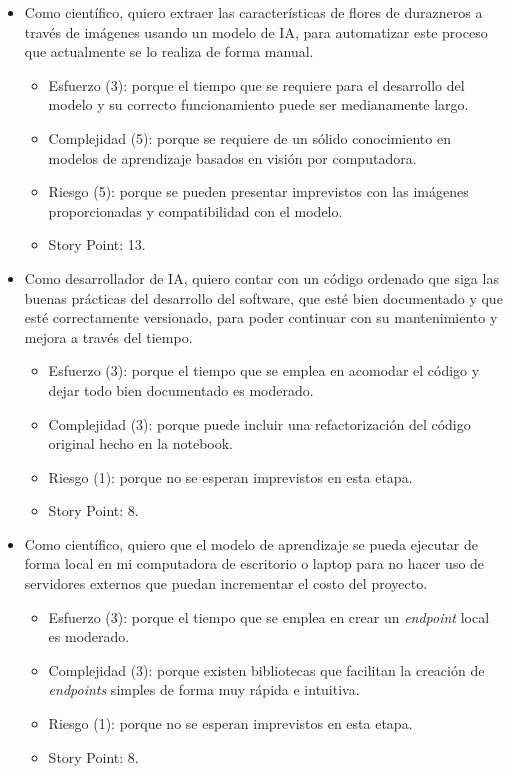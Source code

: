 \documentclass[
11pt, %
codirector, %
]{charter}
\begin{document}
\begin{itemize}
	\item Como científico, quiero extraer las características de flores de durazneros a través de imágenes usando un modelo de IA, para automatizar este proceso que actualmente se lo realiza de forma manual.
	\begin{itemize}
	\item Esfuerzo (3): porque el tiempo que se requiere para el desarrollo del modelo y su correcto funcionamiento puede ser medianamente largo.
	\item Complejidad (5): porque se requiere de un sólido conocimiento en modelos de aprendizaje basados en visión por computadora. 
	\item Riesgo (5): porque se pueden presentar imprevistos con las imágenes proporcionadas y compatibilidad con el modelo.
	\item Story Point: 13.
\end{itemize}
	\item Como desarrollador de IA, quiero contar con un código ordenado que siga las buenas prácticas del desarrollo del software, que esté bien documentado y que esté correctamente versionado, para poder continuar con su mantenimiento y mejora a través del tiempo.
	\begin{itemize}
	\item Esfuerzo (3): porque el tiempo que se emplea en acomodar el código y dejar todo bien documentado es moderado.
	\item Complejidad (3): porque puede incluir una refactorización del código original hecho en la notebook.
	\item Riesgo (1): porque no se esperan imprevistos en esta etapa.
	\item Story Point: 8.
\end{itemize}
	\item Como científico, quiero que el modelo de aprendizaje se pueda ejecutar de forma local en mi computadora de escritorio o laptop para no hacer uso de servidores externos que puedan incrementar el costo del proyecto.
	\begin{itemize}
	\item Esfuerzo (3): porque el tiempo que se emplea en crear un \textit{endpoint} local es moderado.
	\item Complejidad (3): porque existen bibliotecas que facilitan la creación de \textit{endpoints} simples de forma muy rápida e intuitiva.
	\item Riesgo (1): porque no se esperan imprevistos en esta etapa.
	\item Story Point: 8.
\end{itemize}
\end{itemize}
\end{document}
